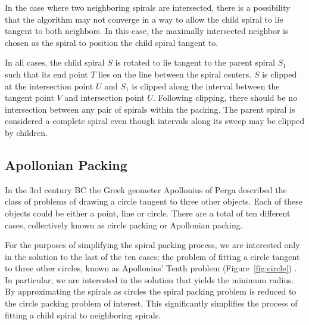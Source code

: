 \documentclass[11pt]{IEEEtran}
\begin{document}
In the case where two neighboring spirals are intersected, there is a possibility that the algorithm may not converge in a way to allow the child spiral to lie tangent to both neighbors. In this case, the maximally intersected neighbor is chosen as the spiral to position the child spiral tangent to.

In all cases, the child spiral \begin{math}S\end{math} is rotated to lie tangent to the parent spiral \begin{math}S_{1}\end{math} such that its end point \begin{math}T\end{math} lies on the line between the spiral centers. \begin{math}S\end{math} is clipped at the intersection point \begin{math}U\end{math} and \begin{math}S_{1}\end{math} is clipped along the interval between the tangent point \begin{math}V\end{math} and intersection point \begin{math}U\end{math}. Following clipping, there should be no intersection between any pair of spirals within the packing. The parent spiral is considered a complete spiral even though intervals along its sweep may be clipped by children.

\subsection{Apollonian Packing}	
In the 3rd century BC the Greek geometer Apollonius of Perga described the class of problems of drawing a circle tangent to three other objects. Each of these objects could be either a point, line or circle. There are a total of ten different cases, collectively known as circle packing or Apollonian packing.\cite{Bourke2006}

For the purposes of simplifying the spiral packing process, we are interested only in the solution to the last of the ten cases; the problem of fitting a circle tangent to three other circles, known as Apollonius' Tenth problem (Figure~\ref{fig:circle}) . In particular, we are interested in the solution that yields the minimum radius.\cite{Browne2006834} By approximating the spirals as circles the spiral packing problem is reduced to the circle packing problem of interest. This significantly simplifies the process of fitting a child spiral to neighboring spirals.
\end{document}
